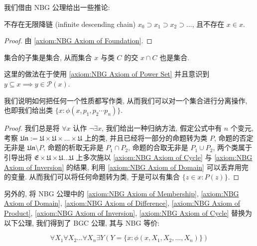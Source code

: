 我们借由 NBG 公理给出一些推论:

\begin{corollary}
    \label {corollary:no infinite descending chain}
    不存在无限降链 (infinite descending chain) \(x_0 \supset x_1 \supset x_2 \supset \dots\), 且不存在 \(x \in x\).

    \begin{proof}
        由 \ref{axiom:NBG Axiom of Foundation}.
    \end{proof}
\end{corollary}

\begin{corollary}
    \label {corollary:NBG every set can be separated by a class}
    集合的子集是集合, 从而集合 \(x\) 与类 \(C\) 的交 \(x \cap C\) 也是集合.

    这里的做法在于使用 \ref{axiom:NBG Axiom of Power Set} 并且意识到 \(y \subseteq x \implies y \in \mathcal{P} (x)\).
\end{corollary}

\begin{corollary}
    \label {corollary:NBG every property can be written as a class}
    我们说明如何把任何一个性质都写作类, 从而我们可以对一个集合进行分离操作, 也即我们给出类 \(\{x : \phi(x,p_1,p_2 \cdots p_n)\}\).

    \begin{proof}
        我们总是将 \(\forall x\) 认作 \(\neg \exists x\), 我们给出一种归纳方法,
        假定公式中有 \(n\) 个变元, 考察 \(\mathfrak{Un} := \mathfrak{U} \times \mathfrak{U} \times \dots \times \mathfrak{U}\) 上的类,
        并且已经将一部分的命题转为类 \(P\), 命题的否定无非是 \(\mathfrak{Un} \setminus P\), 命题的析取无非是 \(P_1 \cap P_2\),
        命题的合取无非是 \(P_1 \cup P_2\), 两个类属于引导出将 \(\mathfrak{E} \times \mathfrak{U} \times \mathfrak{U} \dots \mathfrak{U}\) 上多次施以
        \ref{axiom:NBG Axiom of Cycle} 与 \ref{axiom:NBG Axiom of Inversion} 的结果, 利用 \ref{axiom:NBG Axiom of Domain} 可以丢弃用完的变量.
        从而我们可以将任何命题转为类, 于是可以有集合 \(\{z \in x : P(z)\}\).
    \end{proof}
\end{corollary}

另外的, 将 NBG 公理中的 \ref{axiom:NBG Axiom of Membership}, \ref{axiom:NBG Axiom of Domain},
\ref{axiom:NBG Axiom of Difference}, \ref{axiom:NBG Axiom of Product}, \ref{axiom:NBG Axiom of Inversion},
\ref{axiom:NBG Axiom of Cycle} 替换为以下公理, 我们得到了 BGC 公理, 其与 NBG 等价:

\begin{axiom}
    \label {axiom:BG Axiom of Comprehension}
    \[
        \forall X_1 \forall X_2 \dots \forall X_n \exists Y (Y = \{x : \phi (x,X_1,X_2, \dots,X_n)\})
    \]
\end{axiom}

